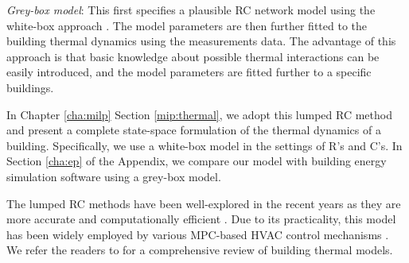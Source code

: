 \emph{Grey-box model}: This first specifies a plausible RC network model using the white-box approach \citep{cigler2013beyond,ghosh2015modeling}. The model parameters are then further fitted to the building thermal dynamics using the measurements data. The advantage of this approach is that basic knowledge about possible thermal interactions can be easily introduced, and the model parameters are fitted further to a specific buildings. 


%
%

In Chapter \ref{cha:milp} Section \ref{mip:thermal}, we adopt this lumped RC method and present a complete state-space formulation of the thermal dynamics of a building. Specifically, we use a white-box model in the settings of R's and C's. In Section \ref{cha:ep} of the Appendix, we compare our model with building energy simulation software using a grey-box model.  

The lumped RC methods have been well-explored in the recent years as they are more accurate and computationally efficient \citep{gouda2000low,gouda2002building,goyal2012method,goyal2011identification,deng2010building,ghosh2015modeling,sturzenegger2014brcm,dobbs2012automatic,ma2012demand,eisenhower2012uncertainty,radecki2012online}. Due to its practicality, this model has been widely employed by various MPC-based HVAC control mechanisms \citep{goyal2012method,goyal2011identification,ma2012demand,sturzenegger2012semi,cigler2013beyond}. We refer the readers to \citep{kramer2012simplified} for a comprehensive review of building thermal models. %

